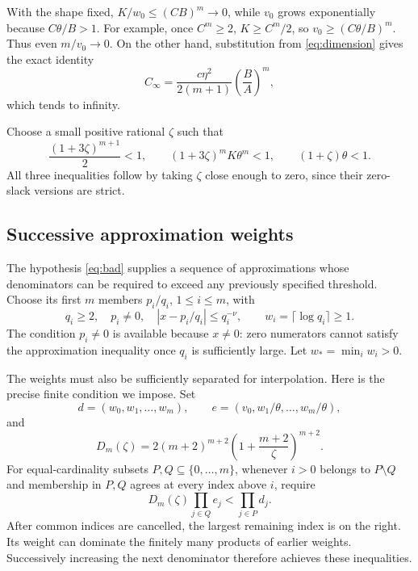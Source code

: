 \documentclass[11pt]{article}
\theoremstyle{definition}
\theoremstyle{remark}
\theoremstyle{plain}
\begin{document}
With the shape fixed,
\(K/w_0\le(CB)^m\to0\), while \(v_0\) grows exponentially because
\(C\theta/B>1\). For example, once \(C^m\ge2\),
\(K\ge C^m/2\), so \(v_0\ge(C\theta/B)^m\). Thus even
\(m/v_0\to0\). On the other hand, substitution from
\eqref{eq:dimension} gives the exact identity
\[
 C_\infty=\frac{c\eta^2}{2(m+1)}\left(\frac BA\right)^m,
\]
which tends to infinity.

Choose a small positive rational \(\zeta\) such that
\begin{equation}\label{eq:slack}
 \frac{(1+3\zeta)^{m+1}}2<1,\qquad
 (1+3\zeta)^mK\theta^m<1,\qquad (1+\zeta)\theta<1.
\end{equation}
All three inequalities follow by taking \(\zeta\) close
enough to zero, since their zero-slack versions are strict.

\subsection{Successive approximation weights}
The hypothesis \eqref{eq:bad} supplies a sequence of approximations whose
denominators can be required to exceed any previously specified threshold.
Choose its first \(m\) members \(p_i/q_i\), \(1\le i\le m\), with
\begin{equation}\label{eq:approxdata}
 q_i\ge2,\quad p_i\ne0,\quad
 |x-p_i/q_i|\le q_i^{-\nu},\qquad
 w_i=\lceil\log q_i\rceil\ge1.
\end{equation}
The condition \(p_i\ne0\) is available because \(x\ne0\): zero
numerators cannot satisfy the approximation inequality once \(q_i\)
is sufficiently large. Let \(w_* =\min_i w_i>0\).

The weights must also be sufficiently separated for interpolation. Here
is the precise finite condition we impose. Set
\[
 d=(w_0,w_1,\ldots,w_m),\qquad
 e=(v_0,w_1/\theta,\ldots,w_m/\theta),
\]
and
\begin{equation}\label{eq:separationconstant}
 D_m(\zeta)=2(m+2)^{m+2}
       \left(1+\frac{m+2}{\zeta}\right)^{m+2}.
\end{equation}
For equal-cardinality subsets \(P,Q\subseteq\{0,\ldots,m\}\), whenever
\(i>0\) belongs to \(P\setminus Q\) and membership in \(P,Q\)
agrees at every index above \(i\), require
\begin{equation}\label{eq:separation}
 D_m(\zeta)\prod_{j\in Q}e_j<\prod_{j\in P}d_j.
\end{equation}
After common indices are cancelled, the largest remaining index is on
the right. Its weight can dominate the finitely many products of earlier
weights. Successively increasing the next denominator therefore achieves
these inequalities.
\end{document}

